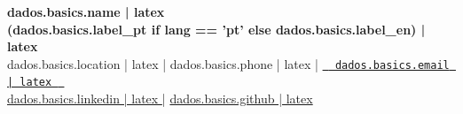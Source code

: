 \documentclass[11pt,a4paper]{article}
\begin{document}
\begin{center}
    {\Huge \textbf{ {{ dados.basics.name | latex }} }} \\
    \vspace{2mm}
    \textbf{ {{ (dados.basics.label_pt if lang == 'pt' else dados.basics.label_en) | latex }} } \\
    \vspace{1mm}
    \small {{ dados.basics.location | latex }} | {{ dados.basics.phone | latex }} | \href{mailto:{{ dados.basics.email }}}{\texttt{ {{ dados.basics.email | latex }} }} \\
    \small \href{https://{{ dados.basics.linkedin }}}{ {{ dados.basics.linkedin | latex }} } | \href{https://{{ dados.basics.github }}}{ {{ dados.basics.github | latex }} }
\end{center}

\vspace{2mm}

\end{document}
